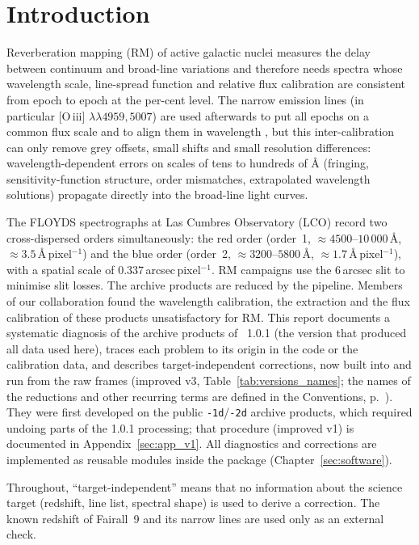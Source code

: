 \chapter{Introduction}
\label{sec:intro}

Reverberation mapping (RM) of active galactic nuclei measures the delay between continuum and broad-line variations
and therefore needs spectra whose wavelength scale, line-spread function and relative flux calibration are
consistent from epoch to epoch at the per-cent level. The narrow emission lines (in particular [O\,{\sc iii}]
$\lambda\lambda4959,5007$) are used afterwards to put all epochs on a common flux scale and to align them in
wavelength \citep{vanGroningen1992,Fausnaugh2017}, but this inter-calibration can only remove grey
offsets, small shifts and small resolution differences: wavelength-dependent errors on scales of tens to hundreds of
\AA{} (fringing, sensitivity-function structure, order mismatches, extrapolated wavelength solutions) propagate
directly into the broad-line light curves.

The FLOYDS spectrographs at Las Cumbres Observatory (LCO) record two cross-dispersed orders simultaneously: the red
order (order~1, $\approx4500$--$10\,000$\,\AA, $\approx3.5$\,\AA\,pixel$^{-1}$) and the blue order (order~2,
$\approx3200$--$5800$\,\AA, $\approx1.7$\,\AA\,pixel$^{-1}$), with a spatial scale of 0.337\,arcsec\,pixel$^{-1}$.
RM campaigns use the 6\,arcsec slit to minimise slit losses. The archive products are reduced by the
\banzai{} pipeline. Members of our collaboration found the wavelength calibration, the extraction and the flux
calibration of these products unsatisfactory for RM. This report documents a systematic diagnosis of the archive
products of \banzai{}~1.0.1 (the version that produced all data used here), traces each problem to its origin in the
code or the calibration data, and describes target-independent corrections, now built into \banzai{} and run from the
raw frames (improved v3, Table~\ref{tab:versions_names}; the names of the reductions and other recurring terms are
defined in the Conventions, p.~\pageref{sec:conventions}). They were first developed on the public
\texttt{-1d}/\texttt{-2d} archive products, which required undoing parts of the 1.0.1 processing; that procedure
(improved v1) is documented in Appendix~\ref{sec:app_v1}. All diagnostics and corrections are implemented as reusable
modules inside the \banzai{} package (Chapter~\ref{sec:software}).

Throughout, ``target-independent'' means that no information about the science target (redshift, line list, spectral
shape) is used to derive a correction. The known redshift of Fairall~9 and its narrow lines are used only as an
external check.

